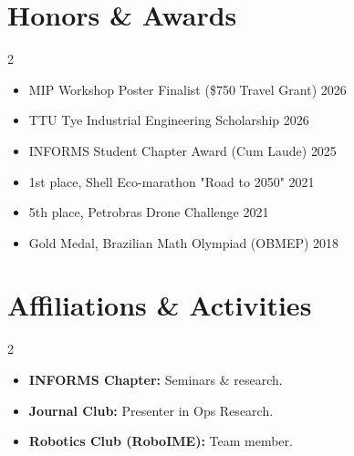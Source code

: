 \documentclass[letterpaper,10pt]{article}
\newcommand{\dategray}[1]{\textcolor{textgray}{#1}}
\begin{document}
\section{Honors \& Awards}
\vspace{-6pt}
\begin{multicols}{2}
\begin{itemize}[leftmargin=14pt, nosep, itemsep=1pt]
    \item MIP Workshop Poster Finalist (\$750 Travel Grant) \hfill \dategray{2026}
    \item TTU Tye Industrial Engineering Scholarship \hfill \dategray{2026}
    \item INFORMS Student Chapter Award (Cum Laude) \hfill \dategray{2025}
    \item 1st place, Shell Eco-marathon "Road to 2050" \hfill \dategray{2021}
    \item 5th place, Petrobras Drone Challenge \hfill \dategray{2021}
    \item Gold Medal, Brazilian Math Olympiad (OBMEP) \hfill \dategray{2018}
\end{itemize}
\end{multicols}
\vspace{-6pt}

\section{Affiliations \& Activities}
\vspace{-6pt}
\begin{multicols}{2}
\begin{itemize}[leftmargin=14pt, nosep, itemsep=1pt]
    \item \textbf{INFORMS Chapter:} Seminars \& research.
    \item \textbf{Journal Club:} Presenter in Ops Research.
    \item \textbf{Robotics Club (RoboIME):} Team member.
\end{itemize}
\end{multicols}
\vspace{-6pt}

\end{document}
